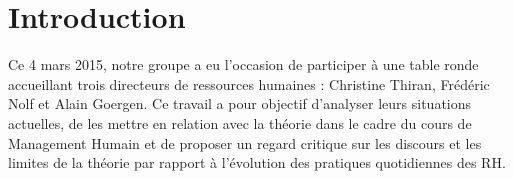 \section{Introduction}

Ce 4 mars 2015, notre groupe a eu l'occasion de participer à une table ronde accueillant trois directeurs de ressources humaines : Christine Thiran, Frédéric Nolf et Alain Goergen. Ce travail a pour objectif d'analyser leurs situations actuelles, de les mettre en relation avec la théorie dans le cadre du cours de Management Humain et de proposer un regard critique sur les discours et les limites de la théorie par rapport à l'évolution des pratiques quotidiennes des RH. \newline

